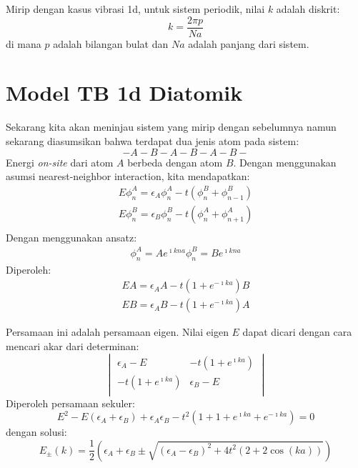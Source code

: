 Mirip dengan kasus vibrasi 1d, untuk sistem periodik, nilai $k$ adalah diskrit:
\begin{equation*}
k = \frac{2\pi p}{Na}
\end{equation*}
di mana $p$ adalah bilangan bulat dan $Na$ adalah panjang dari sistem.


\section{Model TB 1d Diatomik}

Sekarang kita akan meninjau sistem yang mirip dengan sebelumnya
namun sekarang diasumsikan bahwa terdapat dua jenis atom
pada sistem:
\begin{equation*}
- A - B - A - B - A - B -
\end{equation*}
Energi \textit{on-site} dari atom $A$ berbeda dengan atom $B$.
Dengan menggunakan asumsi nearest-neighbor interaction, kita mendapatkan:
\begin{align*}
E \phi_{n}^{A} = \epsilon_{A} \phi_{n}^{A} - t \left( \phi_{n}^{B} + \phi_{n-1}^{B} \right) \\
E \phi_{n}^{B} = \epsilon_{B} \phi_{n}^{B} - t \left( \phi_{n}^{A} + \phi_{n+1}^{A} \right) \\
\end{align*}
Dengan menggunakan ansatz:
\begin{align*}
\phi_{n}^{A} = Ae^{\imath k n a}
\phi_{n}^{B} = Be^{\imath k n a}
\end{align*}
Diperoleh:
\begin{align*}
EA = \epsilon_{A} A - t ( 1 + e^{-\imath k a}) B \\
EB = \epsilon_{A} B - t ( 1 + e^{-\imath k a}) A
\end{align*}

Persamaan ini adalah persamaan eigen. Nilai eigen $E$ dapat
dicari dengan cara mencari akar dari determinan:
\begin{equation*}
\begin{vmatrix}
\epsilon_{A} - E & -t(1 + e^{\imath k a}) \\
-t(1 + e^{\imath k a}) & \epsilon_{B} - E \\
\end{vmatrix}
\end{equation*}
Diperoleh persamaan sekuler:
\begin{equation*}
E^2 - E( \epsilon_A + \epsilon_B ) + \epsilon_{A} \epsilon_{B} -
t^2 (1 + 1 + e^{\imath ka} + e^{-\imath ka}) = 0
\end{equation*}
dengan solusi:
\begin{equation*}
E_{\pm}(k) = \frac{1}{2}\left(
\epsilon_{A} + \epsilon_{B} \pm \sqrt{
(\epsilon_{A} - \epsilon_{B})^2 + 4t^2(2 + 2\cos(ka))
}
\right)
\end{equation*}

